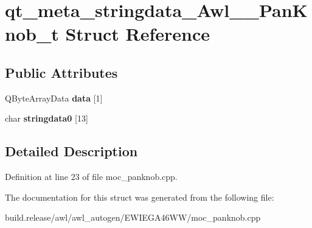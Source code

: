 \hypertarget{structqt__meta__stringdata___awl_____pan_knob__t}{}\section{qt\+\_\+meta\+\_\+stringdata\+\_\+\+Awl\+\_\+\+\_\+\+Pan\+Knob\+\_\+t Struct Reference}
\label{structqt__meta__stringdata___awl_____pan_knob__t}
\subsection*{Public Attributes}
\begin{DoxyCompactItemize}
\item 
\mbox{\label{structqt__meta__stringdata___awl_____pan_knob__t_a2681ccf5b66de5af49820369ca826ed0}} 
Q\+Byte\+Array\+Data {\bfseries data} \mbox{[}1\mbox{]}
\item 
\mbox{\label{structqt__meta__stringdata___awl_____pan_knob__t_a51d3c3f37ce54745d978e57f5de91198}} 
char {\bfseries stringdata0} \mbox{[}13\mbox{]}
\end{DoxyCompactItemize}


\subsection{Detailed Description}


Definition at line 23 of file moc\+\_\+panknob.\+cpp.



The documentation for this struct was generated from the following file\+:\begin{DoxyCompactItemize}
\item 
build.\+release/awl/awl\+\_\+autogen/\+E\+W\+I\+E\+G\+A46\+W\+W/moc\+\_\+panknob.\+cpp\end{DoxyCompactItemize}
